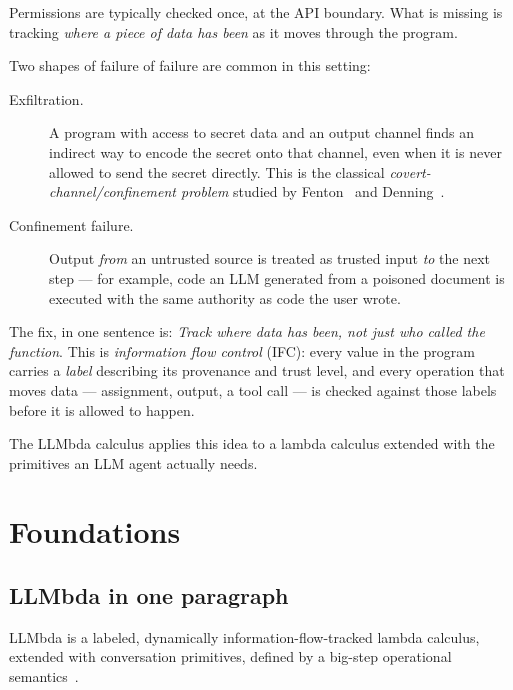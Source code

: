 \documentclass[11pt, a4paper]{article}
\begin{document}
Permissions are typically checked once, at the API boundary. What is
missing is tracking \emph{where a piece of data has been} as it moves
through the program.

Two shapes of failure of failure are common in this setting:

\begin{description}
  \item[Exfiltration.] A program with access to secret data and an output
    channel finds an indirect way to encode the secret onto that channel,
    even when it is never allowed to send the secret directly. This is the
    classical \emph{covert-channel/confinement problem} studied by
    Fenton~\cite{fenton1974} and Denning~\cite{denning1976}.
  \item[Confinement failure.] Output \emph{from} an untrusted source is
    treated as trusted input \emph{to} the next step --- for example, code
    an LLM generated from a poisoned document is executed with the same
    authority as code the user wrote.
\end{description}

The fix, in one sentence is: \emph{Track where data has been, not just who
called the function}. This is \emph{information flow control} (IFC): every
value in the program carries a \emph{label} describing its provenance and trust
level, and every operation that moves data --- assignment, output, a tool call
--- is checked against those labels before it is allowed to happen. 

The LLMbda calculus applies this idea to a lambda calculus extended with the
primitives an LLM agent actually needs.

\section{Foundations}

\subsection{LLMbda in one paragraph}

LLMbda is a labeled, dynamically information-flow-tracked lambda calculus,
extended with conversation primitives, defined by a big-step operational
semantics~\cite{llmbda}.
\end{document}
